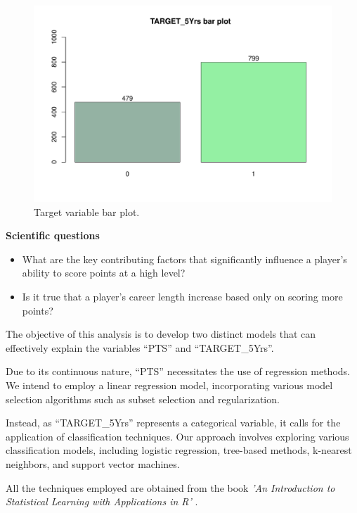 \begin{figure}[H]
	\centering
	\includegraphics[width=0.6\linewidth]{ImageFiles/Histograms/bp_target5yrs.pdf}
	\caption{Target variable bar plot.}
	\label{fig:target_bar_plot}
\end{figure}

\textbf{Scientific questions}
\begin{itemize}
	\item What are the key contributing factors that significantly influence a player's ability to score points at a high level?
	\item Is it true that a player's career length increase based only on scoring more points?
\end{itemize}

\noindent
The objective of this analysis is to develop two distinct models that can effectively explain the variables ``PTS'' and ``TARGET\_5Yrs''. 
 
Due to its continuous nature, ``PTS'' necessitates the use of regression methods. We intend to employ a linear regression model, incorporating various model selection algorithms such as subset selection and regularization.

Instead, as ``TARGET\_5Yrs'' represents a categorical variable, it calls for the application of classification techniques. Our approach involves exploring various classification models, including logistic regression, tree-based methods, k-nearest neighbors, and support vector machines.

All the techniques employed are obtained from the book \textit{'An Introduction to Statistical Learning with Applications in R'} \cite{James2013}.